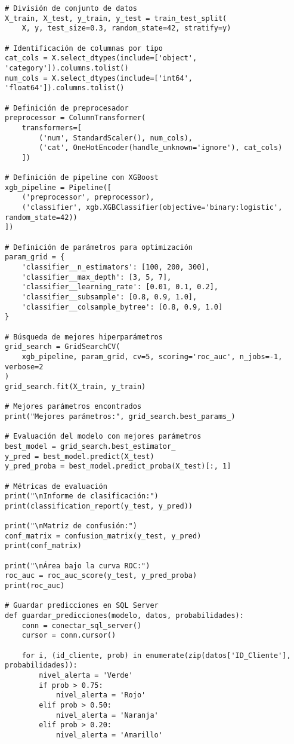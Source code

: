\begin{verbatim}
# División de conjunto de datos
X_train, X_test, y_train, y_test = train_test_split(
    X, y, test_size=0.3, random_state=42, stratify=y)

# Identificación de columnas por tipo
cat_cols = X.select_dtypes(include=['object', 'category']).columns.tolist()
num_cols = X.select_dtypes(include=['int64', 'float64']).columns.tolist()

# Definición de preprocesador
preprocessor = ColumnTransformer(
    transformers=[
        ('num', StandardScaler(), num_cols),
        ('cat', OneHotEncoder(handle_unknown='ignore'), cat_cols)
    ])

# Definición de pipeline con XGBoost
xgb_pipeline = Pipeline([
    ('preprocessor', preprocessor),
    ('classifier', xgb.XGBClassifier(objective='binary:logistic', random_state=42))
])

# Definición de parámetros para optimización
param_grid = {
    'classifier__n_estimators': [100, 200, 300],
    'classifier__max_depth': [3, 5, 7],
    'classifier__learning_rate': [0.01, 0.1, 0.2],
    'classifier__subsample': [0.8, 0.9, 1.0],
    'classifier__colsample_bytree': [0.8, 0.9, 1.0]
}

# Búsqueda de mejores hiperparámetros
grid_search = GridSearchCV(
    xgb_pipeline, param_grid, cv=5, scoring='roc_auc', n_jobs=-1, verbose=2
)
grid_search.fit(X_train, y_train)

# Mejores parámetros encontrados
print("Mejores parámetros:", grid_search.best_params_)

# Evaluación del modelo con mejores parámetros
best_model = grid_search.best_estimator_
y_pred = best_model.predict(X_test)
y_pred_proba = best_model.predict_proba(X_test)[:, 1]

# Métricas de evaluación
print("\nInforme de clasificación:")
print(classification_report(y_test, y_pred))

print("\nMatriz de confusión:")
conf_matrix = confusion_matrix(y_test, y_pred)
print(conf_matrix)

print("\nÁrea bajo la curva ROC:")
roc_auc = roc_auc_score(y_test, y_pred_proba)
print(roc_auc)

# Guardar predicciones en SQL Server
def guardar_predicciones(modelo, datos, probabilidades):
    conn = conectar_sql_server()
    cursor = conn.cursor()
    
    for i, (id_cliente, prob) in enumerate(zip(datos['ID_Cliente'], probabilidades)):
        nivel_alerta = 'Verde'
        if prob > 0.75:
            nivel_alerta = 'Rojo'
        elif prob > 0.50:
            nivel_alerta = 'Naranja'
        elif prob > 0.20:
            nivel_alerta = 'Amarillo'
        

\end{verbatim}
